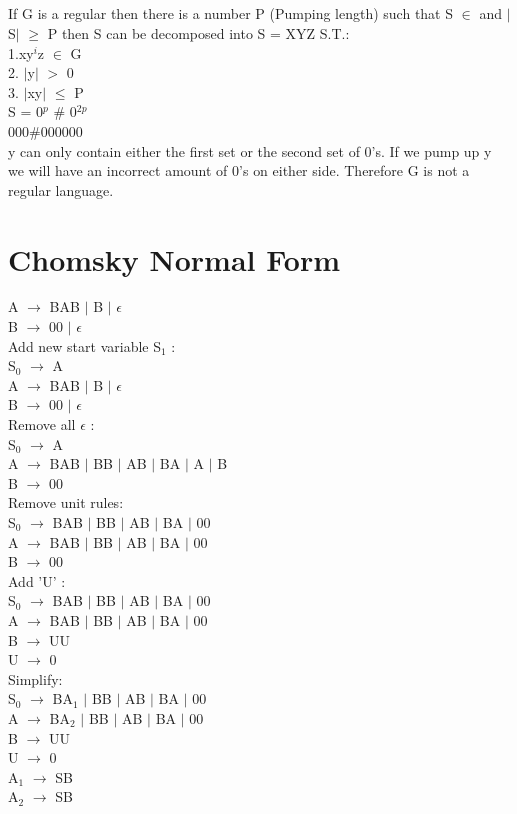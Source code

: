 \documentclass[10pt,a4paper]{article}
\begin{document}
\subsection{}
	If G is a regular then there is a number P (Pumping length) such that S $\in$ and $\mid$S$					\mid$ $\geq$ P then S can be decomposed into S = XYZ S.T.: \\
		1.xy$^{i}$z $\in$ G\\
		2. $\mid$y$\mid$ $>$ 0 \\ 
		3. $\mid$xy$\mid$ $\leq$ P\\
		
	S = 0$^{p}$ \#  0$^{2p}$\\
	000\#000000\\
	y can only contain either the first set or the second set of 0's. If we pump up y we will have an    	incorrect amount of 0's on either side. Therefore G is not a regular language. 
	
\section{Chomsky Normal Form}
	A $\rightarrow$ BAB $\mid$ B $\mid$ $\epsilon$\\
	B $\rightarrow$ 00 $\mid$ $\epsilon$\\
	Add new start variable S$_{1}$ :\\
		S$_{0}$	$\rightarrow$ A\\
		A $\rightarrow$ BAB $\mid$ B $\mid$ $\epsilon$\\
		B $\rightarrow$ 00 $\mid$ $\epsilon$\\		
	Remove all $\epsilon$ :\\
		S$_{0}$	$\rightarrow$ A\\
		A $\rightarrow$ BAB $\mid$ BB $\mid$ AB $\mid$ BA $\mid$ A $\mid$ B \\
		B $\rightarrow$ 00\\
	Remove unit rules:\\
		S$_{0}$	$\rightarrow$ BAB $\mid$ BB $\mid$ AB $\mid$ BA $\mid$ 00\\
		A $\rightarrow$ BAB $\mid$ BB $\mid$ AB $\mid$ BA $\mid$ 00\\
		B $\rightarrow$ 00\\
	Add 'U' :\\
		S$_{0}$	$\rightarrow$ BAB $\mid$ BB $\mid$ AB $\mid$ BA $\mid$ 00\\
		A $\rightarrow$ BAB $\mid$ BB $\mid$ AB $\mid$ BA $\mid$ 00\\
		B $\rightarrow$ UU\\
		U $\rightarrow$ 0\\
	Simplify: \\
		S$_{0}$	$\rightarrow$ BA$_{1}$ $\mid$ BB $\mid$ AB $\mid$ BA $\mid$ 00\\
		A $\rightarrow$ BA$_{2}$ $\mid$ BB $\mid$ AB $\mid$ BA $\mid$ 00\\
		B $\rightarrow$ UU\\
		U $\rightarrow$ 0\\
		A$_{1}$ $\rightarrow$ SB\\
		A$_{2}$ $\rightarrow$ SB\\
		
\end{document}
